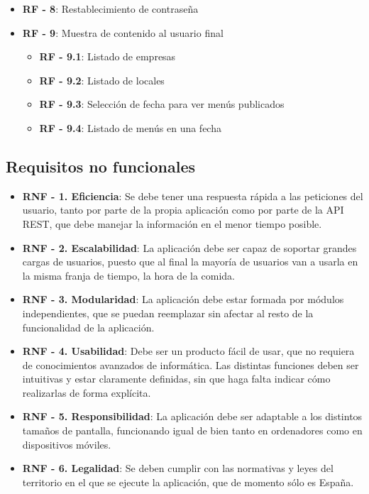 \begin{itemize}
	\item \textbf{RF - 8}: Restablecimiento de contraseña
	\item \textbf{RF - 9}: Muestra de contenido al usuario final
	\begin{itemize}
		\item \textbf{RF - 9.1}: Listado de empresas
		\item \textbf{RF - 9.2}: Listado de locales
		\item \textbf{RF - 9.3}: Selección de fecha para ver menús publicados
		\item \textbf{RF - 9.4}: Listado de menús en una fecha
	\end{itemize}
\end{itemize}

\subsection{Requisitos no funcionales}

\begin{itemize}
\item \textbf{RNF - 1. Eficiencia}: Se debe tener una respuesta rápida a las peticiones del usuario, tanto por parte de la propia aplicación como por parte de la API REST, que debe manejar la información en el menor tiempo posible.
\item \textbf{RNF - 2. Escalabilidad}: La aplicación debe ser capaz de soportar grandes cargas de usuarios, puesto que al final la mayoría de usuarios van a usarla en la misma franja de tiempo, la hora de la comida.
\item \textbf{RNF - 3. Modularidad}: La aplicación debe estar formada por módulos independientes, que se puedan reemplazar sin afectar al resto de la funcionalidad de la aplicación.
\item \textbf{RNF - 4. Usabilidad}: Debe ser un producto fácil de usar, que no requiera de conocimientos avanzados de informática. Las distintas funciones deben ser intuitivas y estar claramente definidas, sin que haga falta indicar cómo realizarlas de forma explícita.
\item \textbf{RNF - 5. Responsibilidad}: La aplicación debe ser adaptable a los distintos tamaños de pantalla, funcionando igual de bien tanto en ordenadores como en dispositivos móviles.
\item \textbf{RNF - 6. Legalidad}: Se deben cumplir con las normativas y leyes del territorio en el que se ejecute la aplicación, que de momento sólo es España.
\end{itemize}


